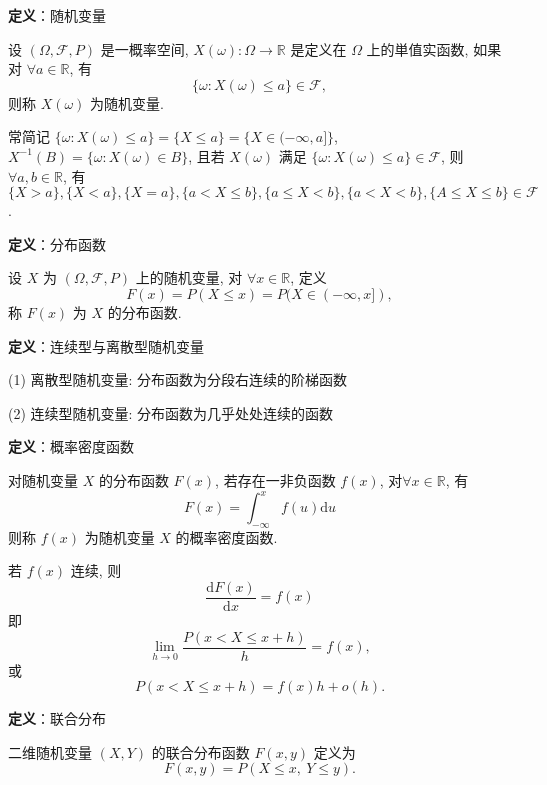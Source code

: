 \documentclass[openany]{ctexbook}
\theoremstyle{kaiti}
\theoremstyle{normal}
\begin{document}
\textbf{定义}：随机变量

设 $(\Omega,\mathcal{F},P)$ 是一概率空间, $X(\omega):\Omega\to\mathbb{R}$ 是定义在 $\Omega$ 上的単值实函数, 如果对 $\forall a\in\mathbb{R}$, 有
\begin{equation}
  \{\omega:X(\omega)\leqslant a\}\in\mathcal{F},
\end{equation}
 则称 $X(\omega)$ 为随机变量.

常简记 $\{\omega:X(\omega)\leqslant a\}=\{X\leqslant a\}=\{X\in(-\infty,a]\}$, $X^{-1}(B)=\{\omega:X(\omega)\in B\}$, 且若 $X(\omega)$ 满足 $\{\omega:X(\omega)\leqslant a\}\in\mathcal{F}$, 则 $\forall a,b\in\mathbb{R}$, 有 $\{X>a\},\{X<a\},\{X=a\},\{a<X\leqslant b\},\{a\leqslant X<b\},\{a<X<b\},\{A\leqslant X\leqslant b\}\in\mathcal{F}$.

\textbf{定义}：分布函数

设 $X$ 为 $(\Omega,\mathcal{F},P)$ 上的随机变量, 对 $\forall x\in\mathbb{R}$, 定义
\begin{equation}
  F(x)=P(X\leqslant x)=P(X\in(-\infty,x]),
\end{equation}
 称 $F(x)$ 为 $X$ 的分布函数.

\textbf{定义}：连续型与离散型随机变量

(1) 离散型随机变量: 分布函数为分段右连续的阶梯函数

(2) 连续型随机变量: 分布函数为几乎处处连续的函数

\textbf{定义}：概率密度函数

对随机变量 $X$ 的分布函数 $F(x)$, 若存在一非负函数 $f(x)$, 对$\forall x\in\mathbb{R}$, 有
\begin{equation}
  F(x)=\int_{-\infty}^xf(u)\mathrm{d}u
\end{equation}
 则称 $f(x)$ 为随机变量 $X$ 的概率密度函数.

若 $f(x)$ 连续, 则
\begin{equation}
  \frac{\mathrm{d}F(x)}{\mathrm{d}x}=f(x)
\end{equation}
 即
\begin{equation}
  \lim_{h\to0}\frac{P(x<X\leqslant x+h)}{h}=f(x),
\end{equation}
 或
\begin{equation}
  P(x<X\leqslant x+h)=f(x)h+o(h).
\end{equation}


\textbf{定义}：联合分布

二维随机变量 $(X,Y)$ 的联合分布函数 $F(x,y)$ 定义为
\begin{equation}
  F(x,y)=P(X\leqslant x,~Y\leqslant y).
\end{equation}
 
\end{document}
